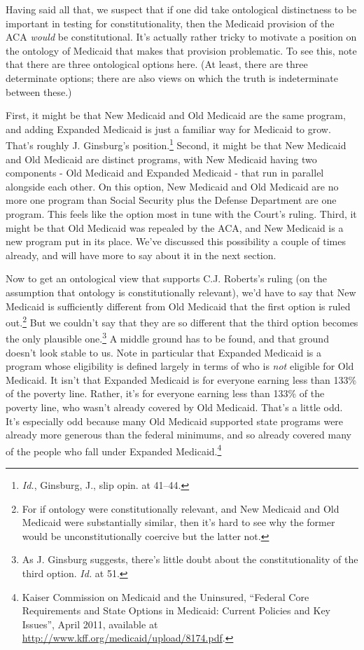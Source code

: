 \documentclass[
  10pt,
  letterpaper,
  DIV=11,
  numbers=noendperiod,
  twoside]{scrartcl}
\begin{document}
Having said all that, we suspect that if one did take ontological
distinctness to be important in testing for constitutionality, then the
Medicaid provision of the ACA \emph{would} be constitutional. It's
actually rather tricky to motivate a position on the ontology of
Medicaid that makes that provision problematic. To see this, note that
there are three ontological options here. (At least, there are three
determinate options; there are also views on which the truth is
indeterminate between these.)

First, it might be that New Medicaid and Old Medicaid are the same
program, and adding Expanded Medicaid is just a familiar way for
Medicaid to grow. That's roughly J. Ginsburg's position.\footnote{\emph{Id.},
  Ginsburg, J., slip opin. at 41--44.} Second, it might be that New
Medicaid and Old Medicaid are distinct programs, with New Medicaid
having two components - Old Medicaid and Expanded Medicaid - that run in
parallel alongside each other. On this option, New Medicaid and Old
Medicaid are no more one program than Social Security plus the Defense
Department are one program. This feels like the option most in tune with
the Court's ruling. Third, it might be that Old Medicaid was repealed by
the ACA, and New Medicaid is a new program put in its place. We've
discussed this possibility a couple of times already, and will have more
to say about it in the next section.

Now to get an ontological view that supports C.J. Roberts's ruling (on
the assumption that ontology is constitutionally relevant), we'd have to
say that New Medicaid is sufficiently different from Old Medicaid that
the first option is ruled out.\footnote{For if ontology were
  constitutionally relevant, and New Medicaid and Old Medicaid were
  substantially similar, then it's hard to see why the former would be
  unconstitutionally coercive but the latter not.} But we couldn't say
that they are so different that the third option becomes the only
plausible one.\footnote{As J. Ginsburg suggests, there's little doubt
  about the constitutionality of the third option. \emph{Id.} at 51.} A
middle ground has to be found, and that ground doesn't look stable to
us. Note in particular that Expanded Medicaid is a program whose
eligibility is defined largely in terms of who is \emph{not} eligible
for Old Medicaid. It isn't that Expanded Medicaid is for everyone
earning less than 133\% of the poverty line. Rather, it's for everyone
earning less than 133\% of the poverty line, who wasn't already covered
by Old Medicaid. That's a little odd. It's especially odd because many
Old Medicaid supported state programs were already more generous than
the federal minimums, and so already covered many of the people who fall
under Expanded Medicaid.\footnote{Kaiser Commission on Medicaid and the
  Uninsured, ``Federal Core Requirements and State Options in Medicaid:
  Current Policies and Key Issues'', April 2011, available at
  \url{http://www.kff.org/medicaid/upload/8174.pdf}.}
\end{document}
